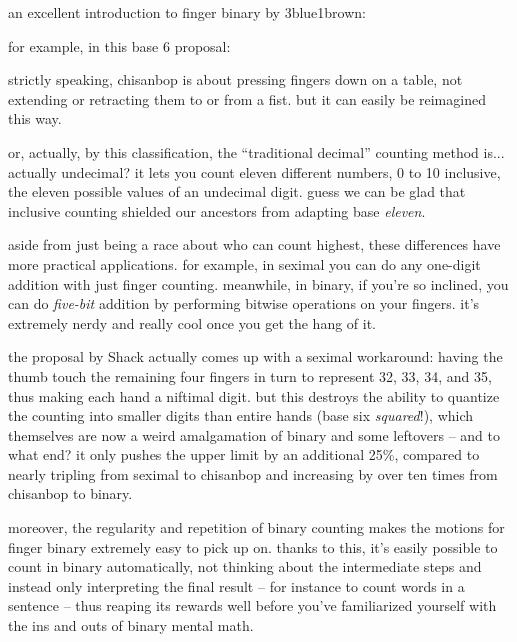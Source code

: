 \documentclass[../footnotes.tex]{subfiles}
\begin{document}

\myfootnote{} an excellent introduction to finger binary by 3blue1brown: \\

\myfootnote{} for example, in this base 6 proposal: \\

\myfootnote{} strictly speaking, chisanbop is about pressing fingers down on a table, not extending or retracting them to or from a fist. but it can easily be reimagined this way.

\myfootnote{} or, actually, by this classification, the ``traditional decimal'' counting method is... actually undecimal? it lets you count eleven different numbers, 0 to 10 inclusive, the eleven possible values of an undecimal digit. guess we can be glad that inclusive counting shielded our ancestors from adapting base \emph{eleven}.

\myfootnote{} aside from just being a race about who can count highest, these differences have more practical applications. for example, in seximal you can do any one-digit addition with just finger counting. meanwhile, in binary, if you're so inclined, you can do \emph{five-bit} addition by performing bitwise operations on your fingers. it's extremely nerdy and really cool once you get the hang of it.

\myfootnote{} the proposal by Shack actually comes up with a seximal workaround: having the thumb touch the remaining four fingers in turn to represent 32, 33, 34, and 35, thus making each hand a niftimal digit. but this destroys the ability to quantize the counting into smaller digits than entire hands (base six \emph{squared}!), which themselves are now a weird amalgamation of binary and some leftovers -- and to what end? it only pushes the upper limit by an additional 25\%, compared to nearly tripling from seximal to chisanbop and increasing by over ten times from chisanbop to binary.

\myfootnote{} moreover, the regularity and repetition of binary counting makes the motions for finger binary extremely easy to pick up on. thanks to this, it's easily possible to count in binary automatically, not thinking about the intermediate steps and instead only interpreting the final result -- for instance to count words in a sentence -- thus reaping its rewards well before you've familiarized yourself with the ins and outs of binary mental math.
\end{document}
